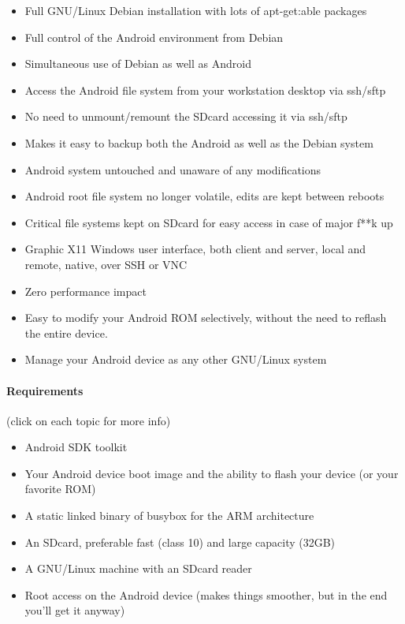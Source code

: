 \begin{itemize}
  \item 
Full GNU/Linux Debian installation with lots of apt-get:able packages
  \item 
Full control of the Android environment from Debian
  \item 
Simultaneous use of Debian as well as Android
  \item 
Access the Android file system from your workstation desktop via ssh/sftp
  \item 
No need to unmount/remount the SDcard accessing it via ssh/sftp
  \item 
Makes it easy to backup both the Android as well as the Debian system
  \item 
Android system untouched and unaware of any modifications
  \item 
Android root file system no longer volatile, edits are kept between reboots
  \item 
Critical file systems kept on SDcard for easy access in case of major f**k up
  \item 
Graphic X11 Windows user interface, both client and server, local and remote,
native, over SSH or VNC
  \item 
Zero performance impact
  \item 
Easy to modify your Android ROM selectively, without the need to reflash the
entire device.
  \item 
Manage your Android device as any other GNU/Linux system
\end{itemize}

\paragraph{Requirements} (click on each topic for more info)

\begin{itemize}
  \item 
Android SDK toolkit
  \item 
Your Android device boot image and the ability to flash your device (or your
favorite ROM)
  \item 
A static linked binary of busybox for the ARM architecture
  \item 
An SDcard, preferable fast (class 10) and large capacity (32GB)
  \item 
A GNU/Linux machine with an SDcard reader
  \item 
Root access on the Android device (makes things smoother, but in the end you'll
get it anyway)
\end{itemize}

